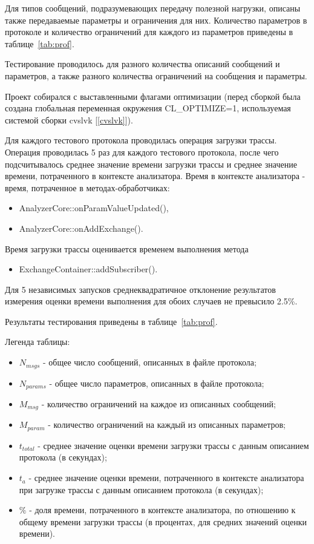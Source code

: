 Для типов сообщений, подразумевающих передачу полезной нагрузки, описаны также 
передаваемые параметры и ограничения для них. Количество параметров в протоколе 
и количество ограничений для каждого из параметров приведены в 
таблице~\ref{tab:prof}.

Тестирование проводилось для разного количества описаний сообщений и 
параметров, а также разного количества ограничений на сообщения и параметры.

Проект собирался с выставленными флагами оптимизации (перед сборкой была 
создана глобальная переменная окружения CL\_OPTIMIZE=1, используемая системой 
сборки cvslvk [\ref{cvslvk}]).

Для каждого тестового протокола проводилась операция загрузки трассы. Операция 
проводилась 5 раз для каждого тестового протокола, после чего подсчитывалось 
среднее значение времени загрузки трассы и среднее значение времени, 
потраченного в контексте анализатора. Время в контексте анализатора - время, 
потраченное в методах-обработчиках:
\begin{itemize}
 \item AnalyzerCore::onParamValueUpdated(),
 \item AnalyzerCore::onAddExchange(). 
\end{itemize}

Время загрузки трассы оценивается временем выполнения метода 

\begin{itemize}
 \item ExchangeContainer::addSubscriber().
\end{itemize}

Для 5 независимых запусков среднеквадратичное отклонение результатов 
измерения оценки времени выполнения для обоих случаев не превысило 2.5\%.

Результаты тестирования приведены в таблице~\ref{tab:prof}.

Легенда таблицы:

\begin{itemize}
 \item $N_{msgs}$ - общее число сообщений, описанных в файле протокола;
 \item $N_{params}$ - общее число параметров, описанных в файле протокола;
 \item $M_{msg}$ - количество ограничений на каждое из описанных сообщений;
 \item $M_{param}$ - количество ограничений на каждый из описанных параметров;
 \item $t_{total}$ - среднее значение оценки времени загрузки трассы с данным 
описанием протокола (в секундах);
 \item $t_{a}$ - среднее значение оценки времени, потраченного в контексте 
анализатора при загрузке трассы с данным описанием протокола (в секундах);
 \item $\%$ - доля времени, потраченного в контексте анализатора, по 
отношению к общему времени загрузки трассы (в процентах, для средних значений 
оценки времени).
\end{itemize}


